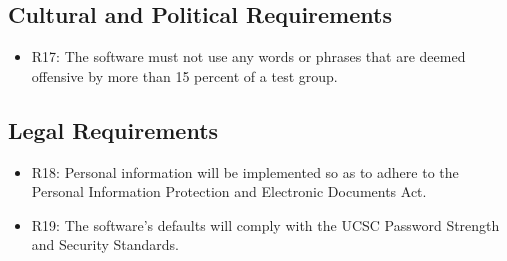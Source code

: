 \documentclass[12pt]{article}
\begin{document}
\subsection{Cultural and Political Requirements}
\begin{itemize}
\item R17: The software must not use any words or phrases that are deemed offensive by more than 15 percent of a test group.
\end{itemize}

\subsection{Legal Requirements}
\begin{itemize}
\item R18: Personal information will be implemented so as to adhere to the Personal Information Protection and Electronic Documents Act. 
\item R19: The software's defaults will comply with the UCSC Password Strength and Security Standards.
\end{itemize}
\end{document}
